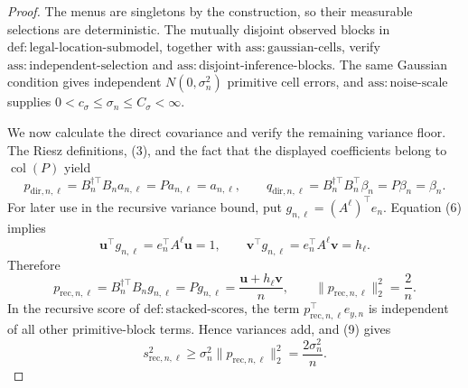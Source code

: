\documentclass{article}
\begin{document}
\begin{proof}
The menus are singletons by the construction, so their measurable selections
are deterministic.  The mutually disjoint observed blocks in
\(\mathrm{def{:}legal\mbox{-}location\mbox{-}submodel}\), together with
\(\mathrm{ass{:}gaussian\mbox{-}cells}\), verify
\(\mathrm{ass{:}independent\mbox{-}selection}\) and
\(\mathrm{ass{:}disjoint\mbox{-}inference\mbox{-}blocks}\).  The same Gaussian
condition gives independent \(N(0,\sigma_n^2)\) primitive cell errors, and
\(\mathrm{ass{:}noise\mbox{-}scale}\) supplies
\(0<c_\sigma\leq\sigma_n\leq C_\sigma<\infty\).

We now calculate the direct covariance and verify the remaining variance
floor.  The Riesz definitions, (3), and the fact that the displayed
coefficients belong to \(\operatorname{col}(P)\) yield
\[
 p_{\mathrm{dir},n,\ell}
 =B_n^{\dagger\top}B_na_{n,\ell}=Pa_{n,\ell}=a_{n,\ell},
 \qquad
 q_{\mathrm{dir},n,\ell}
 =B_n^{\dagger\top}B_n^{\top}\beta_n=P\beta_n=\beta_n.       \tag{8}
\]
For later use in the recursive variance bound, put
\(g_{n,\ell}=(A^\ell)^{\top}e_n\).  Equation (6) implies
\[
 \boldsymbol u^{\top}g_{n,\ell}=e_n^{\top}A^\ell\boldsymbol u=1,
 \qquad
 \boldsymbol v^{\top}g_{n,\ell}=e_n^{\top}A^\ell\boldsymbol v=h_\ell.
\]
Therefore
\[
 p_{\mathrm{rec},n,\ell}
 =B_n^{\dagger\top}B_ng_{n,\ell}
 =Pg_{n,\ell}
 =\frac{\boldsymbol u+h_\ell\boldsymbol v}{n},
 \qquad
 \|p_{\mathrm{rec},n,\ell}\|_2^2=\frac2n.                  \tag{9}
\]
In the recursive score of
\(\mathrm{def{:}stacked\mbox{-}scores}\), the term
\(p_{\mathrm{rec},n,\ell}^{\top}e_{y,n}\) is independent of all other
primitive-block terms.  Hence variances add, and (9) gives
\[
 s_{\mathrm{rec},n,\ell}^2
 \geq \sigma_n^2\|p_{\mathrm{rec},n,\ell}\|_2^2
 =\frac{2\sigma_n^2}{n}.                                    \tag{10}
\]


\end{proof}
\end{document}
